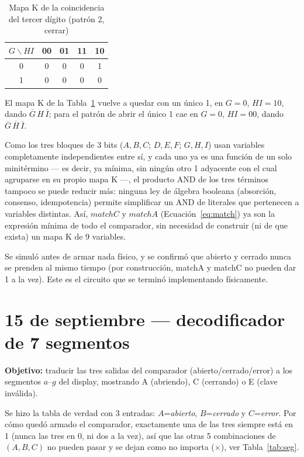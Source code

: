\documentclass[10pt,conference]{IEEEtran}
\begin{document}
	\begin{table}[H]
		\centering
		\caption{Mapa K de la coincidencia del tercer d\'igito (patr\'on 2, cerrar)}
		\label{tab:kmap_digito3}
		\begin{tabular}{c|cccc}
			\toprule
			$G\backslash HI$ & 00 & 01 & 11 & 10\\
			\midrule
			0 & 0 & 0 & 0 & 1\\
			1 & 0 & 0 & 0 & 0\\
			\bottomrule
		\end{tabular}
	\end{table}
	
	El mapa K de la Tabla~\ref{tab:kmap_digito3} vuelve a quedar con un \'unico 1, en $G=0$, $HI=10$,
	dando $\overline{G}\,H\,\overline{I}$; para el patr\'on de abrir el \'unico 1 cae en $G=0$, $HI=00$,
	dando $\overline{G}\,\overline{H}\,\overline{I}$.
	
	Como los tres bloques de 3 bits ($A,B,C$; $D,E,F$; $G,H,I$) usan variables completamente
	independientes entre s\'i, y cada uno ya es una funci\'on de un solo minit\'ermino --- es decir, ya
	m\'inima, sin ning\'un otro 1 adyacente con el cual agruparse en su propio mapa K ---, el producto
	AND de los tres t\'erminos tampoco se puede reducir m\'as: ninguna ley de \'algebra booleana
	(absorci\'on, consenso, idempotencia) permite simplificar un AND de literales que pertenecen a
	variables distintas. As\'i, $matchC$ y $matchA$ (Ecuaci\'on~\ref{eq:match}) ya son la expresi\'on
	m\'inima de todo el comparador, sin necesidad de construir (ni de que exista) un mapa K de 9
	variables.
	
	Se simul\'o antes de armar nada f\'isico, y se confirm\'o que abierto y cerrado nunca se prenden al
	mismo tiempo (por construcci\'on, matchA y matchC no pueden dar 1 a la vez). Este es el circuito
	que se termin\'o implementando f\'isicamente.
	
	\section{15 de septiembre --- decodificador de 7 segmentos}
	\textbf{Objetivo:} traducir las tres salidas del comparador (abierto/cerrado/error) a los
	segmentos $a$--$g$ del display, mostrando A (abriendo), C (cerrando) o E (clave inv\'alida).
	
	Se hizo la tabla de verdad con 3 entradas: $A$=\emph{abierto}, $B$=\emph{cerrado} y
	$C$=\emph{error}. Por c\'omo qued\'o armado el comparador, exactamente una de las tres siempre est\'a
	en 1 (nunca las tres en 0, ni dos a la vez), as\'i que las otras 5 combinaciones de $(A,B,C)$ no
	pueden pasar y se dejan como no importa ($\times$), ver Tabla~\ref{tab:seg}.
	
\end{document}
